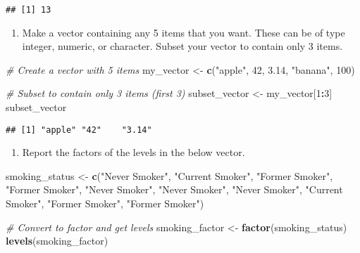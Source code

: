 \documentclass[
]{article}
\newenvironment{Shaded}{\begin{snugshade}}{\end{snugshade}}
\newcommand{\CommentTok}[1]{\textcolor[rgb]{0.56,0.35,0.01}{\textit{#1}}}
\newcommand{\DecValTok}[1]{\textcolor[rgb]{0.00,0.00,0.81}{#1}}
\newcommand{\FloatTok}[1]{\textcolor[rgb]{0.00,0.00,0.81}{#1}}
\newcommand{\FunctionTok}[1]{\textcolor[rgb]{0.13,0.29,0.53}{\textbf{#1}}}
\newcommand{\NormalTok}[1]{#1}
\newcommand{\OtherTok}[1]{\textcolor[rgb]{0.56,0.35,0.01}{#1}}
\newcommand{\SpecialCharTok}[1]{\textcolor[rgb]{0.81,0.36,0.00}{\textbf{#1}}}
\newcommand{\StringTok}[1]{\textcolor[rgb]{0.31,0.60,0.02}{#1}}
\providecommand{\tightlist}{%
  \setlength{\itemsep}{0pt}\setlength{\parskip}{0pt}}
\begin{document}
\begin{verbatim}
## [1] 13
\end{verbatim}

\begin{enumerate}
\def\labelenumi{\arabic{enumi})}
\setcounter{enumi}{8}
\tightlist
\item
  Make a vector containing any 5 items that you want. These can be of
  type integer, numeric, or character. Subset your vector to contain
  only 3 items.
\end{enumerate}

\begin{Shaded}
\begin{Highlighting}[]
\CommentTok{\# Create a vector with 5 items}
\NormalTok{my\_vector }\OtherTok{\textless{}{-}} \FunctionTok{c}\NormalTok{(}\StringTok{"apple"}\NormalTok{, }\DecValTok{42}\NormalTok{, }\FloatTok{3.14}\NormalTok{, }\StringTok{"banana"}\NormalTok{, }\DecValTok{100}\NormalTok{)}

\CommentTok{\# Subset to contain only 3 items (first 3)}
\NormalTok{subset\_vector }\OtherTok{\textless{}{-}}\NormalTok{ my\_vector[}\DecValTok{1}\SpecialCharTok{:}\DecValTok{3}\NormalTok{]}
\NormalTok{subset\_vector}
\end{Highlighting}
\end{Shaded}

\begin{verbatim}
## [1] "apple" "42"    "3.14"
\end{verbatim}

\begin{enumerate}
\def\labelenumi{\arabic{enumi})}
\setcounter{enumi}{9}
\tightlist
\item
  Report the factors of the levels in the below vector.
\end{enumerate}

\begin{Shaded}
\begin{Highlighting}[]
\NormalTok{smoking\_status }\OtherTok{\textless{}{-}} \FunctionTok{c}\NormalTok{(}\StringTok{"Never Smoker"}\NormalTok{, }\StringTok{"Current Smoker"}\NormalTok{, }\StringTok{"Former Smoker"}\NormalTok{, }\StringTok{"Former Smoker"}\NormalTok{, }\StringTok{"Never Smoker"}\NormalTok{, }\StringTok{"Never Smoker"}\NormalTok{, }\StringTok{"Never Smoker"}\NormalTok{, }\StringTok{"Current Smoker"}\NormalTok{, }\StringTok{"Former Smoker"}\NormalTok{, }\StringTok{"Former Smoker"}\NormalTok{)}

\CommentTok{\# Convert to factor and get levels}
\NormalTok{smoking\_factor }\OtherTok{\textless{}{-}} \FunctionTok{factor}\NormalTok{(smoking\_status)}
\FunctionTok{levels}\NormalTok{(smoking\_factor)}
\end{Highlighting}
\end{Shaded}
\end{document}
